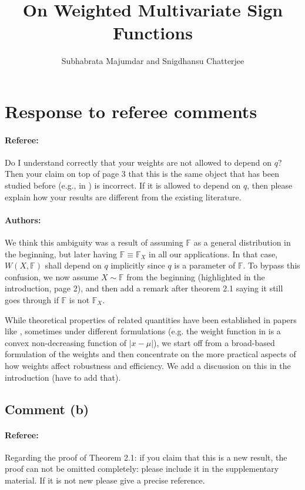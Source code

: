 \documentclass[11pt,letterpaper]{article}
\newcommand{\BF}{{\mathbb{F}}}
\theoremstyle{definition} \newtheorem{Definition}[Theorem]{Definition}
\begin{document}
\title{On Weighted Multivariate Sign Functions}
\date{}
\author{
Subhabrata Majumdar and Snigdhansu Chatterjee
}
\maketitle

\section*{Response to referee comments}

\paragraph{Referee:}
Do I understand correctly that your weights are not allowed to depend on $q$? Then your claim on top of page 3 that this is the same object that has been studied before (e.g., in \cite{ref:AoS97435_Koltchinskii}) is incorrect. If it is allowed to depend on $q$, then please explain how your results
are different from the existing literature.

\paragraph{Authors:} 
We think this ambiguity was a result of assuming $\BF$ as a general distribution in the beginning, but later having $\BF \equiv \BF_X$ in all our applications. In that case, $W(X,\BF)$ shall depend on $q$ implicitly since $q$ is a parameter of $\BF$. To bypass this confusion, we now assume $X \sim \BF$ from the beginning (highlighted in the introduction, page 2), and then add a remark after theorem 2.1 saying it still goes through if $\BF$ is not $\BF_X$.

While theoretical properties of related quantities have been established in papers like \cite{ref:AoS97435_Koltchinskii}, sometimes under different formulations (e.g. the weight function in \cite{ref:AoS97435_Koltchinskii} is a convex non-decreasing function of $|x - \mu|$), we start off from a broad-based formulation of the weights and then concentrate on the more practical aspects of how weights affect robustness and efficiency. We add a discussion on this in the introduction {\color{red} (have to add that)}.

\subsection*{Comment (b)}

\paragraph{Referee:}
Regarding the proof of Theorem 2.1: if you claim that this is a new result, the proof can not be omitted completely: please include it in the supplementary material. If it is not new please give a precise reference.
\end{document}

